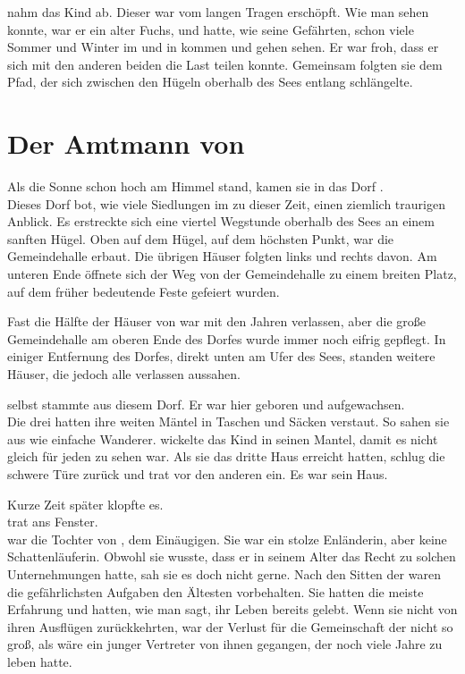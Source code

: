 \begin{Large}
{\Bomar} nahm {\Eno} das Kind ab. Dieser war vom langen Tragen erschöpft. Wie man sehen konnte, war er ein alter Fuchs, und hatte, wie seine Gefährten, schon viele Sommer und Winter im {\Enland} und in {\Rhingell} kommen und gehen sehen. Er war froh, dass er sich mit den anderen beiden die Last teilen konnte. Gemeinsam folgten sie dem Pfad, der sich zwischen den Hügeln oberhalb des Sees entlang schlängelte.

\chapter{Der Amtmann von {\Berna}}
Als die Sonne schon hoch am Himmel stand, kamen sie in das Dorf {\Berna}.\\
Dieses Dorf bot, wie viele Siedlungen im {\Enland} zu dieser Zeit, einen ziemlich traurigen Anblick. Es erstreckte sich eine viertel Wegstunde oberhalb des Sees an einem sanften Hügel. Oben auf dem Hügel, auf dem höchsten Punkt, war die Gemeindehalle erbaut. Die übrigen Häuser folgten links und rechts davon. Am unteren Ende öffnete sich der Weg von der Gemeindehalle zu einem breiten Platz, auf dem früher bedeutende Feste gefeiert wurden.

Fast die Hälfte der Häuser von {\Berna} war mit den Jahren verlassen, aber die große Gemeindehalle am oberen Ende des Dorfes wurde immer noch eifrig gepflegt. In einiger Entfernung des Dorfes, direkt unten am Ufer des Sees, standen weitere Häuser, die jedoch alle verlassen aussahen.

{\Bomar} selbst stammte aus diesem Dorf. Er war hier geboren und aufgewachsen.\\
Die drei {\Schattenlaufer} hatten ihre weiten Mäntel in Taschen und Säcken verstaut. So sahen sie aus wie einfache Wanderer. {\Eno} wickelte das Kind in seinen Mantel, damit es nicht gleich für jeden zu sehen war. Als sie das dritte Haus erreicht hatten, schlug {\Bomar} die schwere Türe zurück und trat vor den anderen ein. Es war sein Haus.

Kurze Zeit später klopfte es.\\
{\Bomar} trat ans Fenster. \\
{\Mena} war die Tochter von {\Eno}, dem Einäugigen. Sie war ein stolze Enländerin, aber keine Schattenläuferin. Obwohl sie wusste, dass er in seinem Alter das Recht zu solchen Unternehmungen hatte, sah sie es doch nicht gerne. Nach den Sitten der {\Schattenlaufer} waren die gefährlichsten Aufgaben den Ältesten vorbehalten. Sie hatten die meiste Erfahrung und hatten, wie man sagt, ihr Leben bereits gelebt. Wenn sie nicht von ihren Ausflügen zurückkehrten, war der Verlust für die Gemeinschaft der {\Schattenlaufer} nicht so groß, als wäre ein junger Vertreter von ihnen gegangen, der noch viele Jahre zu leben hatte. 


\end{Large}
